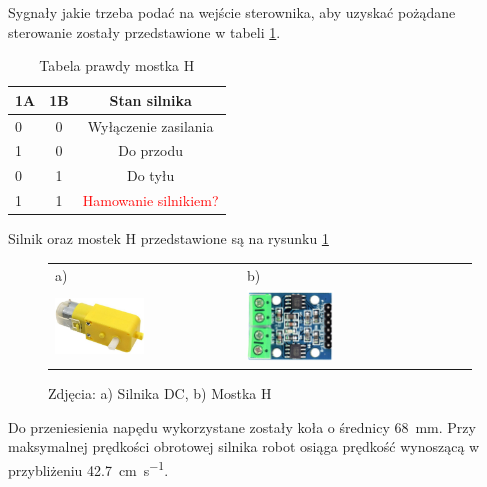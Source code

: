 		Sygnały jakie trzeba podać na wejście sterownika, aby uzyskać pożądane sterowanie zostały przedstawione w tabeli \ref{tab:tabelaPrawdyMostkaH}.
		
		\begin{table}[ht]
			\centering
			\begin{tabular}{|l|c|c|} \hline
				\textbf{1A} & \textbf{1B} & \textbf{Stan silnika} \\
				\hline
				\hline 	0 & 0 & Wyłączenie zasilania\\
				\hline 	1	& 0 & Do przodu \\
				\hline 	0 & 1 & Do tyłu \\
				\hline 	1 & 1 & \textcolor{red}{Hamowanie silnikiem?} \\
				\hline
			\end{tabular}
			\caption{Tabela prawdy mostka H}
			\label{tab:tabelaPrawdyMostkaH}
		\end{table}
		
		Silnik oraz mostek H przedstawione są na rysunku \ref{fig:silnikImostek}
		\begin{figure}[ht]
			\centering
			\begin{tabular}{@{}ll@{}}
				a) & b) \\
				\includegraphics[width=0.5\textwidth]{rys02/silnikDC.jpg} & 
				\includegraphics[width=0.4\textwidth]{rys02/mostekHzdj.jpg} \\
			\end{tabular}
			\caption{Zdjęcia: a) Silnika DC, b) Mostka H}
			\label{fig:silnikImostek}
		\end{figure}
	
		Do przeniesienia napędu wykorzystane zostały koła o średnicy \SI{68}{\milli\meter}. Przy maksymalnej prędkości obrotowej silnika robot osiąga prędkość wynoszącą w przybliżeniu \SI[per-mode=symbol]{42.7}{\cm\per\second}.
		
